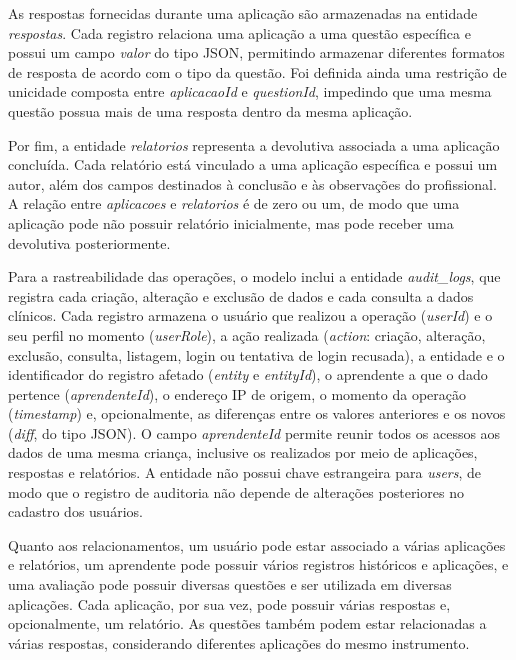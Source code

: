 As respostas fornecidas durante uma aplicação são armazenadas na entidade \textit{respostas}. Cada registro relaciona uma aplicação a uma questão específica e possui um campo \textit{valor} do tipo JSON, permitindo armazenar diferentes formatos de resposta de acordo com o tipo da questão. Foi definida ainda uma restrição de unicidade composta entre \textit{aplicacaoId} e \textit{questionId}, impedindo que uma mesma questão possua mais de uma resposta dentro da mesma aplicação.

Por fim, a entidade \textit{relatorios} representa a devolutiva associada a uma aplicação concluída. Cada relatório está vinculado a uma aplicação específica e possui um autor, além dos campos destinados à conclusão e às observações do profissional. A relação entre \textit{aplicacoes} e \textit{relatorios} é de zero ou um, de modo que uma aplicação pode não possuir relatório inicialmente, mas pode receber uma devolutiva posteriormente.

Para a rastreabilidade das operações, o modelo inclui a entidade \textit{audit\_logs}, que registra cada criação, alteração e exclusão de dados e cada consulta a dados clínicos. Cada registro armazena o usuário que realizou a operação (\textit{userId}) e o seu perfil no momento (\textit{userRole}), a ação realizada (\textit{action}: criação, alteração, exclusão, consulta, listagem, login ou tentativa de login recusada), a entidade e o identificador do registro afetado (\textit{entity} e \textit{entityId}), o aprendente a que o dado pertence (\textit{aprendenteId}), o endereço IP de origem, o momento da operação (\textit{timestamp}) e, opcionalmente, as diferenças entre os valores anteriores e os novos (\textit{diff}, do tipo JSON). O campo \textit{aprendenteId} permite reunir todos os acessos aos dados de uma mesma criança, inclusive os realizados por meio de aplicações, respostas e relatórios. A entidade não possui chave estrangeira para \textit{users}, de modo que o registro de auditoria não depende de alterações posteriores no cadastro dos usuários.

Quanto aos relacionamentos, um usuário pode estar associado a várias aplicações e relatórios, um aprendente pode possuir vários registros históricos e aplicações, e uma avaliação pode possuir diversas questões e ser utilizada em diversas aplicações. Cada aplicação, por sua vez, pode possuir várias respostas e, opcionalmente, um relatório. As questões também podem estar relacionadas a várias respostas, considerando diferentes aplicações do mesmo instrumento.

